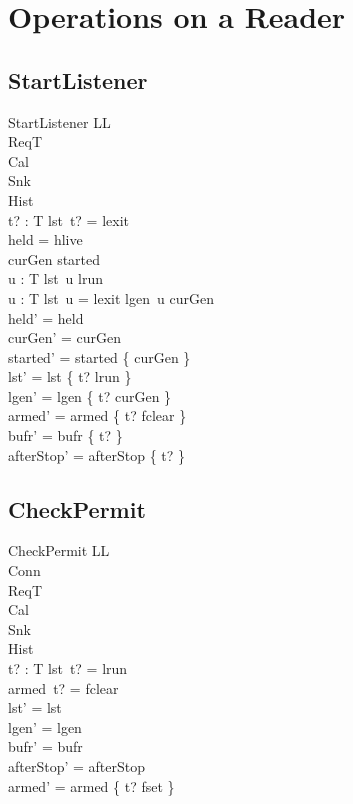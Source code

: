 \documentclass[a4paper,10pt,fleqn]{article}
\begin{document}
\section{Operations on a Reader}

\subsection{StartListener}

\begin{schema}{StartListener}
  \Delta LL \\
  \Xi ReqT \\
  \Xi Cal \\
  \Xi Snk \\
  \Xi Hist \\
  t? : T
\where
  lst~t? = lexit \\
  held = hlive \\
  curGen \notin started \\
  \forall u : T \spot lst~u \neq lrun \\
  \forall u : T \spot lst~u = lexit \lor lgen~u \neq curGen \\
  held' = held \\
  curGen' = curGen \\
  started' = started \cup \{ curGen \} \\
  lst' = lst \oplus \{ t? \mapsto lrun \} \\
  lgen' = lgen \oplus \{ t? \mapsto curGen \} \\
  armed' = armed \oplus \{ t? \mapsto fclear \} \\
  bufr' = bufr \oplus \{ t? \mapsto \emptyset \} \\
  afterStop' = afterStop \oplus \{ t?  \}
\end{schema}

\subsection{CheckPermit}

\begin{schema}{CheckPermit}
  \Delta LL \\
  \Xi Conn \\
  \Xi ReqT \\
  \Xi Cal \\
  \Xi Snk \\
  \Xi Hist \\
  t? : T
\where
  lst~t? = lrun \\
  armed~t? = fclear \\
  lst' = lst \\
  lgen' = lgen \\
  bufr' = bufr \\
  afterStop' = afterStop \\
  armed' = armed \oplus \{ t? \mapsto fset \}
\end{schema}
\end{document}
